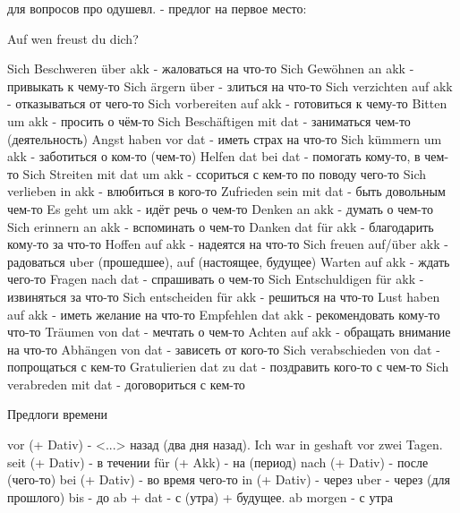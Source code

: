 \documentclass[12pt]{report}
\begin{document}
для вопросов про одушевл. - предлог на первое место:

Auf wen freust du dich?

Sich Beschweren über akk - жаловаться на что-то
Sich Gewöhnen an akk - привыкать к чему-то
Sich ärgern über - злиться на что-то
Sich verzichten auf akk - отказываться от чего-то
Sich vorbereiten auf akk - готовиться к чему-то
Bitten um akk - просить о чём-то
Sich Beschäftigen mit dat - заниматься чем-то (деятельность)
Angst haben vor dat - иметь страх на что-то
Sich kümmern um akk - заботиться о ком-то (чем-то)
Helfen dat bei dat - помогать кому-то, в чем-то
Sich Streiten mit dat um akk - ссориться с кем-то по поводу чего-то
Sich verlieben in akk - влюбиться в кого-то
Zufrieden sein mit dat - быть довольным чем-то
Es geht um akk - идёт речь о чем-то
Denken an akk - думать о чем-то
Sich erinnern an akk - вспоминать о чем-то
Danken dat für akk - благодарить кому-то за что-то
Hoffen auf akk - надеятся на что-то
Sich freuen auf/über akk - радоваться uber (прошедшее), auf (настоящее, будущее)
Warten auf akk - ждать чего-то
Fragen nach dat - спрашивать о чем-то
Sich Entschuldigen für akk - извиняться за что-то
Sich entscheiden für akk - решиться на что-то
Lust haben auf akk - иметь желание на что-то
Empfehlen dat akk - рекомендовать кому-то что-то
Träumen von dat - мечтать о чем-то
Achten auf akk - обращать внимание на что-то
Abhängen von dat - зависеть от кого-то
Sich verabschieden von dat - попрощаться с кем-то
Gratulierien dat zu dat - поздравить кого-то с чем-то
Sich verabreden mit dat - договориться с кем-то

Предлоги времени

vor (+ Dativ) - <...> назад (два дня назад). Ich war in geshaft vor zwei Tagen.
seit (+ Dativ) - в течении 
für (+ Akk) - на (период)
nach (+ Dativ) - после (чего-то)
bei (+ Dativ) - во время чего-то
in (+ Dativ) - через
uber - через (для прошлого)
bis - до 
ab + dat - с (утра) + будущее. ab morgen - с утра
\end{document}
